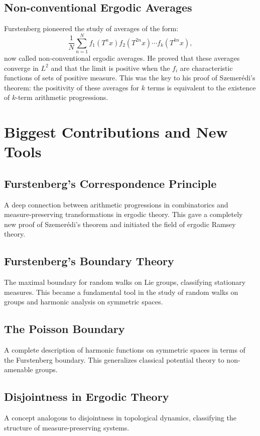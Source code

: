 \subsection{Non-conventional Ergodic Averages}

Furstenberg pioneered the study of averages of the form:
\[
\frac{1}{N} \sum_{n=1}^N f_1(T^n x) f_2(T^{2n} x) \cdots f_k(T^{kn} x),
\]
now called non-conventional ergodic averages. He proved that these averages converge in $L^2$ and that the limit is positive when the $f_i$ are characteristic functions of sets of positive measure. This was the key to his proof of Szemer\'edi's theorem: the positivity of these averages for $k$ terms is equivalent to the existence of $k$-term arithmetic progressions.

\section{Biggest Contributions and New Tools}

\subsection{Furstenberg's Correspondence Principle}
A deep connection between arithmetic progressions in combinatorics and measure-preserving transformations in ergodic theory. This gave a completely new proof of Szemer\'edi's theorem and initiated the field of ergodic Ramsey theory.

\subsection{Furstenberg's Boundary Theory}
The maximal boundary for random walks on Lie groups, classifying stationary measures. This became a fundamental tool in the study of random walks on groups and harmonic analysis on symmetric spaces.

\subsection{The Poisson Boundary}
A complete description of harmonic functions on symmetric spaces in terms of the Furstenberg boundary. This generalizes classical potential theory to non-amenable groups.

\subsection{Disjointness in Ergodic Theory}
A concept analogous to disjointness in topological dynamics, classifying the structure of measure-preserving systems.

